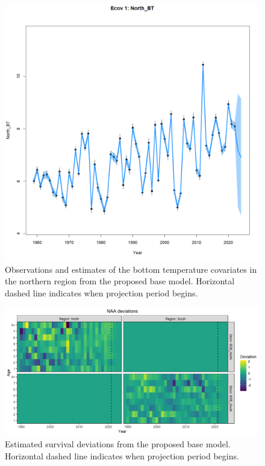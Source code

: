 \documentclass[
]{article}
\begin{document}
\begin{figure}

{\centering \includegraphics[width=0.65\linewidth]{../2023.RT.Runs/Run34/projections/plots_png/results/Ecov_1_North_BT} 

}

\caption{Observations and estimates of the bottom temperature covariates in the northern region from the proposed base model. Horizontal dashed line indicates when projection period begins.}\label{fig:bottom-temp-proj}
\end{figure}

\begin{figure}

{\centering \includegraphics[width=1\linewidth]{../2023.RT.Runs/Run34/projections/plots_png/results/NAA_dev_tile} 

}

\caption{Estimated survival deviations from the proposed base model. Horizontal dashed line indicates when projection period begins.}\label{fig:NAA-devs-proj}
\end{figure}
\end{document}
